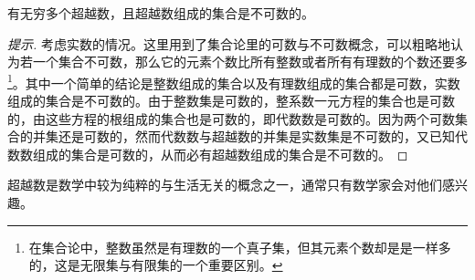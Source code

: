 \begin{theorem}
  有无穷多个超越数，且超越数组成的集合是不可数的。
\end{theorem}
\begin{proof}[提示]
  考虑实数的情况。这里用到了集合论里的可数与不可数概念，可以粗略地认为若一个集合不可数，那么它的元素个数比所有整数或者所有有理数的个数还要多\footnote{在集合论中，整数虽然是有理数的一个真子集，但其元素个数却是是一样多的，这是无限集与有限集的一个重要区别。}。其中一个简单的结论是整数组成的集合以及有理数组成的集合都是可数，实数组成的集合是不可数的。由于整数集是可数的，整系数一元方程的集合也是可数的，由这些方程的根组成的集合也是可数的，即代数数是可数的。因为两个可数集合的并集还是可数的，然而代数数与超越数的并集是实数集是不可数的，又已知代数数组成的集合是可数的，从而必有超越数组成的集合是不可数的。
\end{proof}

超越数是数学中较为纯粹的与生活无关的概念之一，通常只有数学家会对他们感兴趣。